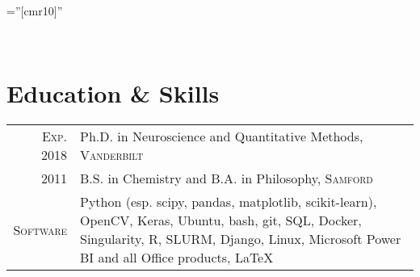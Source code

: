 \documentclass[a4paper,11pt]{article}
\begin{document}
\pagestyle{empty} %

\font\fb=''[cmr10]'' %

\par{
 \\ \medskip
}


\section{Education \& Skills}
\begin{tabular}{rp{11cm}}	

    \textsc{Exp.} 2018 & Ph.D. in Neuroscience and Quantitative Methods, \textsc{Vanderbilt} \medskip \\
    
    2011 & B.S. in Chemistry and B.A. in Philosophy, \textsc{Samford} \medskip \\

    \textsc{Software} & \small{Python (esp. scipy, pandas, matplotlib, scikit-learn), OpenCV, Keras, Ubuntu, bash, git, SQL, Docker, Singularity, R, SLURM, Django, Linux, Microsoft Power BI and all Office products, LaTeX} \\


\end{tabular}
\end{document}
